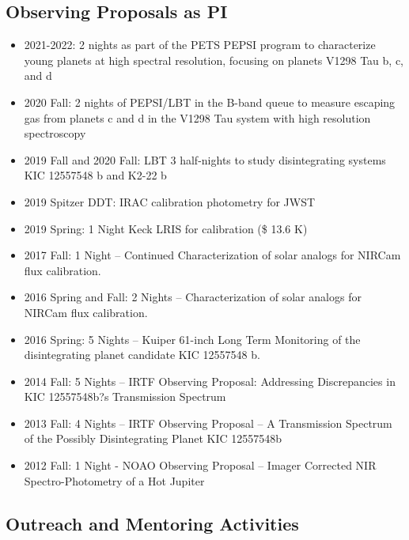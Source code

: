\documentclass[11pt, oneside]{article}   	%
\begin{document}
\subsection*{Observing Proposals as PI}
\begin{itemize}[noitemsep]
    \item 2021-2022: 2 nights as part of the PETS PEPSI program to characterize young planets at high spectral resolution, focusing on planets V1298 Tau b, c, and d
    \item 2020 Fall: 2 nights of PEPSI/LBT in the B-band queue to measure escaping gas from planets c and d in the V1298 Tau system with high resolution spectroscopy
    \item 2019 Fall and 2020 Fall: LBT 3 half-nights to study disintegrating systems KIC 12557548 b and K2-22 b
    \item 2019 Spitzer DDT: IRAC calibration photometry for JWST
    \item 2019 Spring: 1 Night Keck LRIS for calibration (\$ 13.6 K)
    \item 2017 Fall: 1 Night -- Continued Characterization of solar analogs for NIRCam flux calibration.
    \item 2016 Spring and Fall: 2 Nights -- Characterization of solar analogs for NIRCam flux calibration.
    \item 2016 Spring: 5 Nights -- Kuiper 61-inch Long Term Monitoring of the disintegrating planet candidate KIC 12557548 b.
    \item 2014 Fall: 5 Nights -- IRTF Observing Proposal: Addressing Discrepancies in KIC 12557548b?s Transmission Spectrum
    \item 2013 Fall: 4 Nights -- IRTF Observing Proposal -- A Transmission Spectrum of the Possibly Disintegrating Planet KIC 12557548b
    \item 2012 Fall: 1 Night - NOAO Observing Proposal -- Imager Corrected NIR Spectro-Photometry of a Hot Jupiter
\end{itemize}


\subsection*{Outreach and Mentoring Activities}
\end{document}
